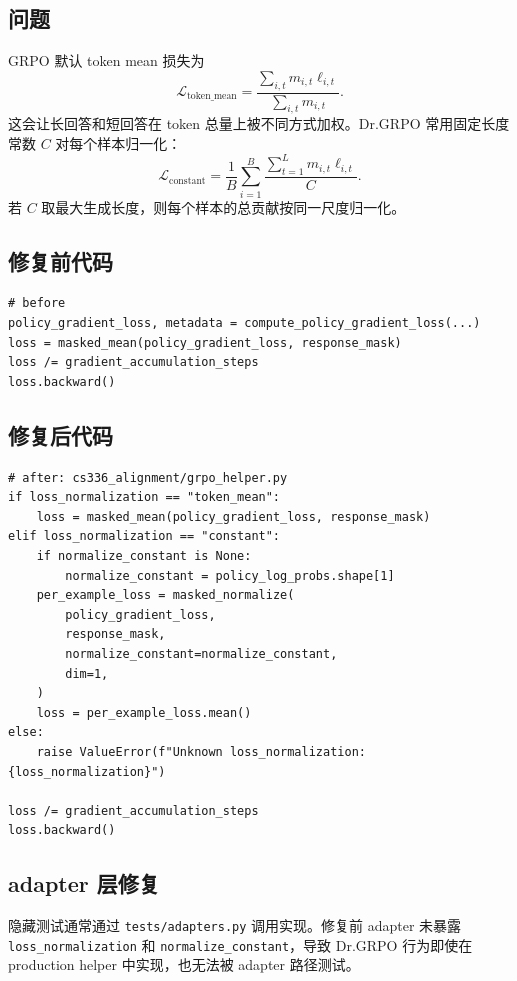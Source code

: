 \documentclass[UTF8,a4paper,11pt]{ctexart}
\begin{document}
\subsection{问题}

GRPO 默认 token mean 损失为
\[
  \mathcal{L}_{\mathrm{token\_mean}}
  =
  \frac{\sum_{i,t}m_{i,t}\ell_{i,t}}
       {\sum_{i,t}m_{i,t}}.
\]
这会让长回答和短回答在 token 总量上被不同方式加权。Dr.GRPO 常用固定长度常数 $C$ 对每个样本归一化：
\[
  \mathcal{L}_{\mathrm{constant}}
  =
  \frac{1}{B}\sum_{i=1}^{B}
  \frac{\sum_{t=1}^{L}m_{i,t}\ell_{i,t}}{C}.
\]
若 $C$ 取最大生成长度，则每个样本的总贡献按同一尺度归一化。

\subsection{修复前代码}

\begin{lstlisting}
# before
policy_gradient_loss, metadata = compute_policy_gradient_loss(...)
loss = masked_mean(policy_gradient_loss, response_mask)
loss /= gradient_accumulation_steps
loss.backward()
\end{lstlisting}

\subsection{修复后代码}

\begin{lstlisting}
# after: cs336_alignment/grpo_helper.py
if loss_normalization == "token_mean":
    loss = masked_mean(policy_gradient_loss, response_mask)
elif loss_normalization == "constant":
    if normalize_constant is None:
        normalize_constant = policy_log_probs.shape[1]
    per_example_loss = masked_normalize(
        policy_gradient_loss,
        response_mask,
        normalize_constant=normalize_constant,
        dim=1,
    )
    loss = per_example_loss.mean()
else:
    raise ValueError(f"Unknown loss_normalization: {loss_normalization}")

loss /= gradient_accumulation_steps
loss.backward()
\end{lstlisting}

\subsection{adapter 层修复}

隐藏测试通常通过 \texttt{tests/adapters.py} 调用实现。修复前 adapter 未暴露 \texttt{loss\_normalization} 和 \texttt{normalize\_constant}，导致 Dr.GRPO 行为即使在 production helper 中实现，也无法被 adapter 路径测试。
\end{document}
